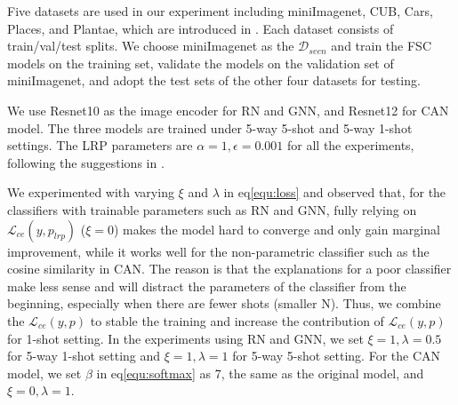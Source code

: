 \documentclass[a4paper,conference]{IEEEtran}
\begin{document}
Five datasets are used in our experiment including miniImagenet\cite{miniImageNet:vinyals2016matching}, CUB\cite{CUB:wah2011caltech}, Cars\cite{Cars:krause20133d}, Places\cite{Places:zhou2017places}, and Plantae\cite{Plantae:van2018inaturalist}, which are introduced in \cite{FeaturewiseTranslayer:tseng2020cross}. Each dataset consists of train/val/test splits. We choose miniImagenet as the $\mathcal{D}_{seen}$ and train the FSC models on the training set, validate the models on the validation set of miniImagenet, and adopt the test sets of the other four datasets for testing.

We use Resnet10\cite{Resnet:he2016deep} as the image encoder for RN and GNN, and Resnet12 for CAN model. The three models are trained under 5-way 5-shot and 5-way 1-shot settings.
The LRP parameters are $\alpha=1, \epsilon=0.001$ for all the experiments, following the suggestions in \cite{SebasIJCNN2020:kohlbrenner2019towards}.

We experimented with varying $\xi$ and $\lambda$ in eq\eqref{equ:loss} and observed that, for the classifiers with trainable parameters such as RN and GNN, fully relying on $\mathcal{L}_{ce}(y, p_{lrp})$ ($\xi = 0$) makes the model hard to converge and only gain marginal improvement, while it works well for the non-parametric classifier such as the cosine similarity in CAN. The reason is that the explanations for a poor classifier make less sense and will distract the parameters of the classifier from the beginning, especially when there are fewer shots (smaller N). Thus, we combine the $\mathcal{L}_{ce}(y, p)$ to stable the training and increase the contribution of $\mathcal{L}_{ce}(y, p)$ for 1-shot setting. In the experiments using RN and GNN, we set $\xi=1, \lambda=0.5$ for 5-way 1-shot setting and $\xi=1, \lambda=1$ for 5-way 5-shot setting. For the CAN model, we set $\beta$ in eq\eqref{equ:softmax} as 7, the same as the original model, and $\xi=0, \lambda=1$.
\end{document}
